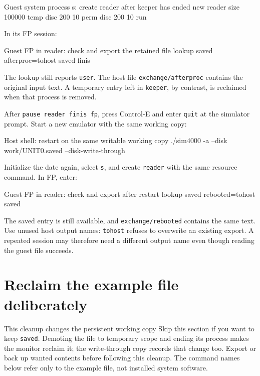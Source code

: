 \begin{commandexample}{Guest system process s: create reader after keeper has ended}
new reader size 100000 temp disc 200 10 perm disc 200 10 run
\end{commandexample}

In its FP session:

\begin{commandexample}{Guest FP in reader: check and export the retained file}
lookup saved
afterproc=tohost saved
finis
\end{commandexample}

The lookup still reports \passthrough{\lstinline!user!}. The host file \passthrough{\lstinline!exchange/afterproc!} contains the original input text. A temporary entry left in \passthrough{\lstinline!keeper!}, by contrast, is reclaimed when that process is removed.

After \passthrough{\lstinline!pause reader finis fp!}, press Control-E and enter \passthrough{\lstinline!quit!} at the simulator prompt. Start a new emulator with the same working copy:

\begin{commandexample}[language=sh]{Host shell: restart on the same writable working copy}
./sim4000 -a --disk work/UNIT0.saved --disk-write-through
\end{commandexample}

Initialize the date again, select \passthrough{\lstinline!s!}, and create \passthrough{\lstinline!reader!} with the same resource command. In FP, enter:

\begin{commandexample}{Guest FP in reader: check and export after restart}
lookup saved
rebooted=tohost saved
\end{commandexample}

The saved entry is still available, and \passthrough{\lstinline!exchange/rebooted!} contains the same text. Use unused host output names: \passthrough{\lstinline!tohost!} refuses to overwrite an existing export. A repeated session may therefore need a different output name even though reading the guest file succeeds.

\section{Reclaim the example file deliberately}\label{reclaim-the-example-file-deliberately}

\begin{operationnote}{This cleanup changes the persistent working copy}
Skip this section if you want to keep \passthrough{\lstinline!saved!}.
Demoting the file to temporary scope and ending its process makes the
monitor reclaim it; the write-through copy records that change too. Export
or back up wanted contents before following this cleanup. The command
names below refer only to the example file, not installed system software.
\end{operationnote}

